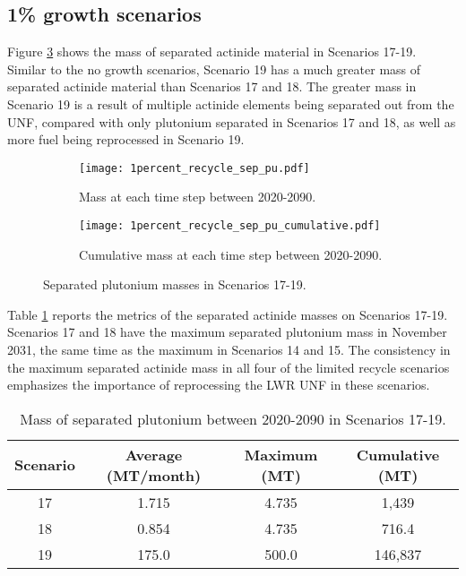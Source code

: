 \subsection{1\% growth scenarios}
Figure \ref{fig:1percent_recycle_sep_pu} shows the mass of separated 
actinide material in Scenarios 17-19. Similar to the no growth 
scenarios, Scenario 19 has a much greater mass of separated 
actinide material than Scenarios 17 and 18. The greater mass in 
Scenario 19 is a result of multiple actinide elements being 
separated out from the \gls{UNF}, compared with only 
plutonium separated in Scenarios 17 and 18, as well as more fuel 
being reprocessed in Scenario 19. 

\begin{figure}[h!]
    \centering
    \begin{subfigure}[b]{0.49\textwidth}
        \centering
        \texttt{[image: 1percent\_recycle\_sep\_pu.pdf]}
        \caption{Mass 
        at each time step between 2020-2090.}
        \label{fig:1percent_recycle_sep_pu_all}
    \end{subfigure}
    \hfill
    \begin{subfigure}[b]{0.49\textwidth}
        \centering
        \texttt{[image: 1percent\_recycle\_sep\_pu\_cumulative.pdf]}
        \caption{Cumulative mass 
        at each time step between 2020-2090.}
        \label{fig:1percent_recycle_sep_pu_cumulative}
    \end{subfigure}
       \caption{Separated plutonium masses in Scenarios 17-19.}
       \label{fig:1percent_recycle_sep_pu}
\end{figure}

Table \ref{tab:s17-19_sep_pu} reports the metrics of the separated 
actinide masses on Scenarios 17-19. Scenarios 17 and 18 have the 
maximum separated plutonium mass in November 2031, the same time 
as the maximum in Scenarios 14 and 15. The consistency in the 
maximum separated actinide mass in all four of the limited 
recycle scenarios emphasizes the importance of reprocessing the 
\gls{LWR} \gls{UNF} in these scenarios. 

\begin{table}[h!]
    \centering 
    \caption{Mass of separated plutonium between 2020-2090 in Scenarios 
    17-19.}
    \label{tab:s17-19_sep_pu}
    \begin{tabular}{c c c c}
        \hline 
        Scenario & Average (MT/month) & Maximum (MT) & Cumulative (MT) \\
        \hline
        17 & 1.715 & 4.735 & 1,439\\
        18 & 0.854 & 4.735 & 716.4\\
        19 & 175.0 & 500.0 & 146,837\\
        \hline
    \end{tabular}
\end{table}


